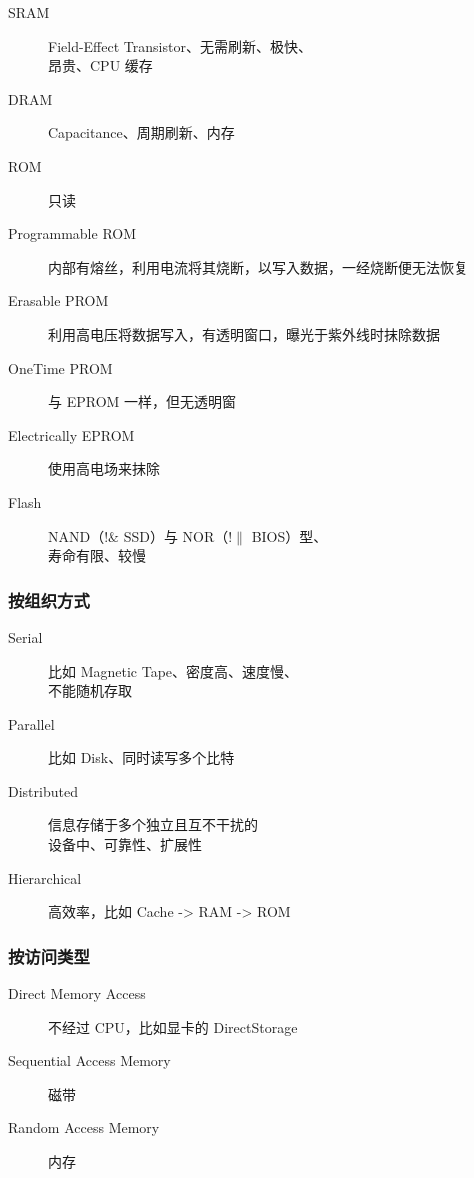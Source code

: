 \documentclass[11pt,journal,compsoc]{IEEEtran}
\begin{document}
\begin{description}
    \item[SRAM] Field-Effect Transistor、无需刷新、极快、\\ 昂贵、CPU 缓存

    \item[DRAM] Capacitance、周期刷新、内存

    \item[ROM] 只读

    \item[Programmable ROM] 内部有熔丝，利用电流将其烧断，以写入数据，一经烧断便无法恢复

    \item[Erasable PROM] 利用高电压将数据写入，有透明窗口，曝光于紫外线时抹除数据

    \item[OneTime PROM] 与 EPROM 一样，但无透明窗

    \item[Electrically EPROM] 使用高电场来抹除

    \item[Flash] NAND（$!\&$ SSD）与 NOR（$!\|$ BIOS）型、\\ 寿命有限、较慢
\end{description}


\subsubsection{按组织方式}

\begin{description}
    \item[Serial] 比如 Magnetic Tape、密度高、速度慢、\\ 不能随机存取

    \item[Parallel] 比如 Disk、同时读写多个比特

    \item[Distributed] 信息存储于多个独立且互不干扰的 \\ 设备中、可靠性、扩展性

    \item[Hierarchical] 高效率，比如 Cache -> RAM -> ROM
\end{description}


\subsubsection{按访问类型}

\begin{description}
    \item[Direct Memory Access] 不经过 CPU，比如显卡的 DirectStorage

    \item[Sequential Access Memory] 磁带

    \item[Random Access Memory] 内存
\end{description}
\end{document}
